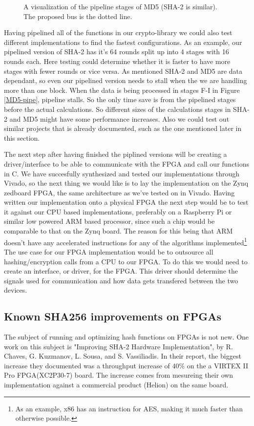 \documentclass[a4paper, openany]{book}
\begin{document}
\begin{abstact}
\begin{figure}[htbp]
\caption{\label{fig:org19af266}A visualization of the pipeline stages of MD5 (SHA-2 is similar). The proposed bus is the dotted line.}
\end{figure}

Having pipelined all of the functions in our crypto-library we could also test different implementations to find the fastest configurations.
As an example, our pipelined version of SHA-2 has it's 64 rounds split up into 4 stages with 16 rounds each.
Here testing could determine whether it is faster to have more stages with fewer rounds or vice versa.
As mentioned SHA-2 and MD5 are data dependant, so even our pipelined version needs to stall when the we are handling more than one block.
When the data is being processed in stages F-I in Figure \ref{MD5-pipe}, pipeline stalls. So the only time save is from the pipelined stages before the actual calculations.
So different sizes of the calculations stages in SHA-2 and MD5 might have some performance increases.
Also we could test out similar projects that is already documented, such as the one mentioned later in this section.

The next step after having finished the piplined versions will be creating a driver/interface to be able to communicate with the FPGA and call our functions in C.
We have succesfully synthesized and tested our implementations through Vivado, so the next thing we would like is to lay the implementation on the Zynq zedboard FPGA,
the same architecture as we've tested on in Vivado.
Having written our implementation onto a physical FPGA the next step would be to test it against our CPU based implementations, preferably on a Raspberry Pi
or similar low powered ARM based processor, since such a chip would be comparable to that on the Zynq board.
The reason for this being that ARM doesn't have any accelerated instructions for any of the algorithms implemented\footnote{As an example, x86 has an instruction for AES, making it much faster than otherwise possible.}
The use case for our FPGA implementation would be to outsource all hashing/encryption calls from a CPU to our FPGA. To do this we would need to create
an interface, or driver, for the FPGA.
This driver should determine the signals used for communication and how data gets transfered between the two devices.
\subsection{Known SHA256 improvements on FPGAs}
\label{sec:org19a0a01}
The subject of running and optimizing hash functions on FPGAs is not new. One work on this subject is "Improving SHA-2 Hardware Implementation", by R. Chaves, G. Kuzmanov, L. Sousa, and S. Vassiliadis.
In their report, the biggest increase they documented was a throughput increase of 40\% on the a VIRTEX II Pro FPGA(XC2P30-7) board.
The increase comes from mesureing their own implementation against a commercial product (Helion) on the same board.


\end{abstact}
\end{document}
